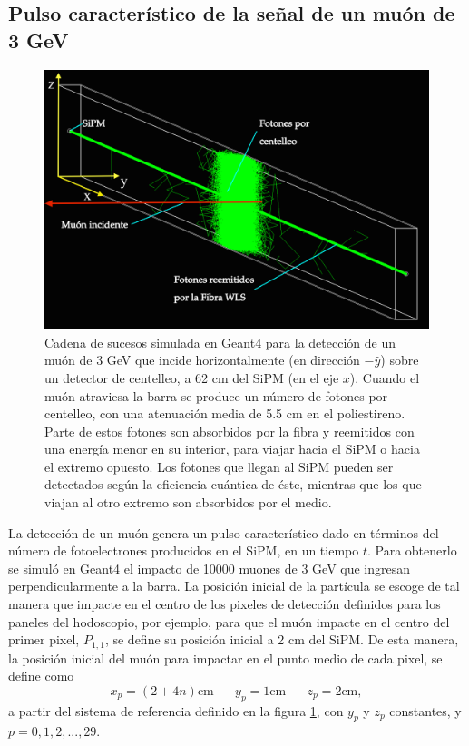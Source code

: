 \documentclass[12pt,oneside,openany,letter]{book}
\begin{document}
\subsection{Pulso característico de la señal de un muón de 3 GeV}
\begin{figure}[h!]
    \centering
     \includegraphics[scale=0.45]{11.png}
   \caption[Cadena de sucesos para la detección de un muón de 3 GeV que incide horizontalmente sobre un detector de centelleo]{Cadena de sucesos simulada en Geant4 para la detección de un muón de 3 GeV que incide horizontalmente (en direcci\'on $-\hat{y}$) sobre un detector de centelleo, a 62 cm del SiPM (en el eje $x$). Cuando el muón atraviesa la barra se produce un número de fotones por centelleo, con una atenuaci\'on media de 5.5 cm en el poliestireno. Parte de estos fotones son absorbidos por la fibra y reemitidos con una energía menor en su interior, para viajar hacia el SiPM o hacia el extremo opuesto. Los fotones que llegan al SiPM pueden ser detectados según la eficiencia cu\'antica de \'este, mientras que los que viajan al otro extremo son absorbidos por el medio.}\label{barra_muon}
\end{figure}

La detección de un muón genera un pulso característico dado en términos del número de fotoelectrones producidos en el SiPM, en un tiempo $t$. Para obtenerlo se simuló en Geant4 el impacto de 10000 muones de 3 GeV que ingresan perpendicularmente a la barra. La posici\'on inicial de la part\'icula se escoge de tal manera que impacte en el centro de los pixeles de detecci\'on definidos para los paneles del hodoscopio, por ejemplo, para que el mu\'on impacte en el centro del primer pixel, $P_{1,1}$, se define su posici\'on inicial a 2 cm del SiPM. De esta manera, la posici\'on inicial del mu\'on para impactar en el punto medio de cada pixel, se define como 
\begin{equation}
\label{posiciones}
x_p = (2 + 4n)\mathrm{cm} \,\,\,\,\,\,\,\,\,\, y_p = 1\mathrm{cm}  \,\,\,\,\,\,\,\,\,\, z_p = 2\mathrm{cm},
\end{equation}
a partir del sistema de referencia definido en la figura \ref{barra_muon}, con $y_p$ y $z_p$ constantes, y $p=0,1,2,...,29$. 
\end{document}

